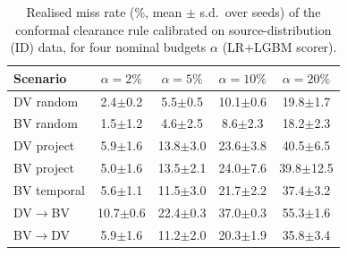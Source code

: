 \begin{table}[t]
\centering\small
\caption{Realised miss rate (\%, mean $\pm$ s.d.\ over seeds) of the conformal clearance rule calibrated on source-distribution (ID) data, for four nominal budgets $\alpha$ (LR+LGBM scorer).}\label{tab:alpha}
\begin{tabular}{lcccc}
\toprule
Scenario & $\alpha{=}2\%$ & $\alpha{=}5\%$ & $\alpha{=}10\%$ & $\alpha{=}20\%$ \\
\midrule
DV random & 2.4{\scriptsize$\pm$0.2} & 5.5{\scriptsize$\pm$0.5} & 10.1{\scriptsize$\pm$0.6} & 19.8{\scriptsize$\pm$1.7} \\
BV random & 1.5{\scriptsize$\pm$1.2} & 4.6{\scriptsize$\pm$2.5} & 8.6{\scriptsize$\pm$2.3} & 18.2{\scriptsize$\pm$2.3} \\
DV project & 5.9{\scriptsize$\pm$1.6} & 13.8{\scriptsize$\pm$3.0} & 23.6{\scriptsize$\pm$3.8} & 40.5{\scriptsize$\pm$6.5} \\
BV project & 5.0{\scriptsize$\pm$1.6} & 13.5{\scriptsize$\pm$2.1} & 24.0{\scriptsize$\pm$7.6} & 39.8{\scriptsize$\pm$12.5} \\
BV temporal & 5.6{\scriptsize$\pm$1.1} & 11.5{\scriptsize$\pm$3.0} & 21.7{\scriptsize$\pm$2.2} & 37.4{\scriptsize$\pm$3.2} \\
DV$\to$BV & 10.7{\scriptsize$\pm$0.6} & 22.4{\scriptsize$\pm$0.3} & 37.0{\scriptsize$\pm$0.3} & 55.3{\scriptsize$\pm$1.6} \\
BV$\to$DV & 5.9{\scriptsize$\pm$1.6} & 11.2{\scriptsize$\pm$2.0} & 20.3{\scriptsize$\pm$1.9} & 35.8{\scriptsize$\pm$3.4} \\
\bottomrule
\end{tabular}
\end{table}

